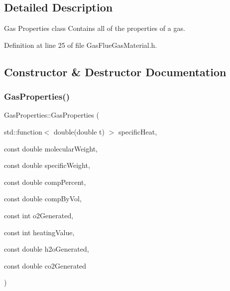 \subsection{Detailed Description}
Gas Properties class Contains all of the properties of a gas. 

Definition at line 25 of file Gas\+Flue\+Gas\+Material.\+h.



\subsection{Constructor \& Destructor Documentation}
\mbox{\label{class_gas_properties_a95b506951beca31785d5207ff744ead9}} 
\subsubsection{\texorpdfstring{Gas\+Properties()}{GasProperties()}\hspace{0.1cm}{\footnotesize\ttfamily [1/3]}}
{\footnotesize\ttfamily Gas\+Properties\+::\+Gas\+Properties (\begin{DoxyParamCaption}\item[{std\+::function$<$ double(double t) $>$}]{specific\+Heat,  }\item[{const double}]{molecular\+Weight,  }\item[{const double}]{specific\+Weight,  }\item[{const double}]{comp\+Percent,  }\item[{const double}]{comp\+By\+Vol,  }\item[{const int}]{o2\+Generated,  }\item[{const int}]{heating\+Value,  }\item[{const double}]{h2o\+Generated,  }\item[{const double}]{co2\+Generated }\end{DoxyParamCaption})\hspace{0.3cm}{\ttfamily [inline]}}


